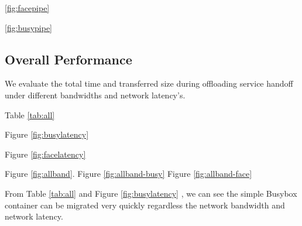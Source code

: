 


\ref{fig:facepipe}

\ref{fig:busypipe}


\subsection{Overall Performance}
We evaluate the total time and transferred size during offloading service handoff under different bandwidths and network latency's. 





Table \ref{tab:all}


Figure \ref{fig:busylatency}

Figure \ref{fig:facelatency}

Figure \ref{fig:allband}.
Figure \ref{fig:allband-busy} 
Figure \ref{fig:allband-face}

From Table \ref{tab:all} and Figure \ref{fig:busylatency} , we can see the simple Busybox container can be migrated very quickly regardless the network bandwidth and network latency.









